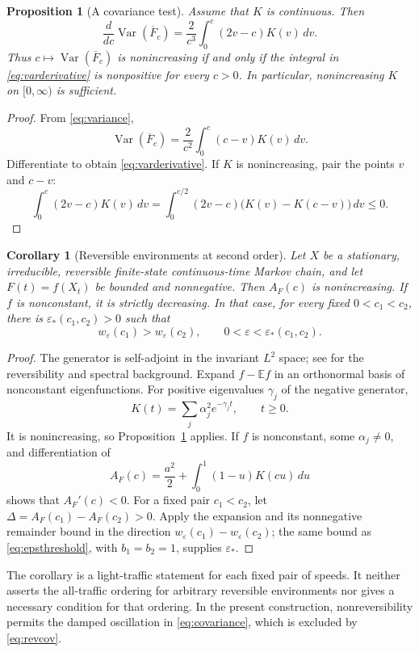 \documentclass[10pt,a4paper]{amsart}
\numberwithin{equation}{section}
\newtheorem{proposition}[theorem]{Proposition}
\newtheorem{corollary}[theorem]{Corollary}
\newcommand{\E}{\mathbb E}
\newcommand{\1}{\mathbf 1}
\newcommand{\eps}{\varepsilon}
\DeclareMathOperator{\Var}{Var}
\begin{document}
\begin{proposition}[A covariance test]\label{prop:derivative}
Assume that $K$ is continuous. Then
\begin{equation}\label{eq:varderivative}
 \frac{d}{dc}\Var(\overline F_c)
 =\frac2{c^3}\int_0^c(2v-c)K(v)\,dv.
\end{equation}
Thus $c\mapsto\Var(\overline F_c)$ is nonincreasing if and only if the integral in \eqref{eq:varderivative} is nonpositive for every $c>0$. In particular, nonincreasing $K$ on $[0,\infty)$ is sufficient.
\end{proposition}
\begin{proof}
From \eqref{eq:variance},
\[
 \Var(\overline F_c)=\frac2{c^2}\int_0^c(c-v)K(v)\,dv.
\]
Differentiate to obtain \eqref{eq:varderivative}. If $K$ is nonincreasing, pair the points $v$ and $c-v$:
\[
 \int_0^c(2v-c)K(v)\,dv
 =\int_0^{c/2}(2v-c)\bigl(K(v)-K(c-v)\bigr)\,dv\le0.
\]
\end{proof}

\begin{corollary}[Reversible environments at second order]\label{cor:reversible}
Let $X$ be a stationary, irreducible, reversible finite-state continuous-time Markov chain, and let $F(t)=f(X_t)$ be bounded and nonnegative. Then $A_F(c)$ is nonincreasing. If $f$ is nonconstant, it is strictly decreasing. In that case, for every fixed $0<c_1<c_2$, there is $\eps_*(c_1,c_2)>0$ such that
\[
 w_\eps(c_1)>w_\eps(c_2),\qquad 0<\eps<\eps_*(c_1,c_2).
\]
\end{corollary}
\begin{proof}
The generator is self-adjoint in the invariant $L^2$ space; see \cite{Kelly79,LevinPeres17} for the reversibility and spectral background. Expand $f-\E f$ in an orthonormal basis of nonconstant eigenfunctions. For positive eigenvalues $\gamma_j$ of the negative generator,
\begin{equation}\label{eq:revcov}
 K(t)=\sum_j\alpha_j^2 e^{-\gamma_j t},\qquad t\ge0.
\end{equation}
It is nonincreasing, so Proposition~\ref{prop:derivative} applies. If $f$ is nonconstant, some $\alpha_j\ne0$, and differentiation of
\[
 A_F(c)=\frac{a^2}{2}+\int_0^1(1-u)K(cu)\,du
\]
shows that $A_F'(c)<0$. For a fixed pair $c_1<c_2$, let $\Delta=A_F(c_1)-A_F(c_2)>0$. Apply the expansion and its nonnegative remainder bound in the direction $w_\eps(c_1)-w_\eps(c_2)$; the same bound as \eqref{eq:epsthreshold}, with $b_1=b_2=1$, supplies $\eps_*$.
\end{proof}
The corollary is a light-traffic statement for each fixed pair of speeds. It neither asserts the all-traffic ordering for arbitrary reversible environments nor gives a necessary condition for that ordering. In the present construction, nonreversibility permits the damped oscillation in \eqref{eq:covariance}, which is excluded by \eqref{eq:revcov}.
\end{document}
